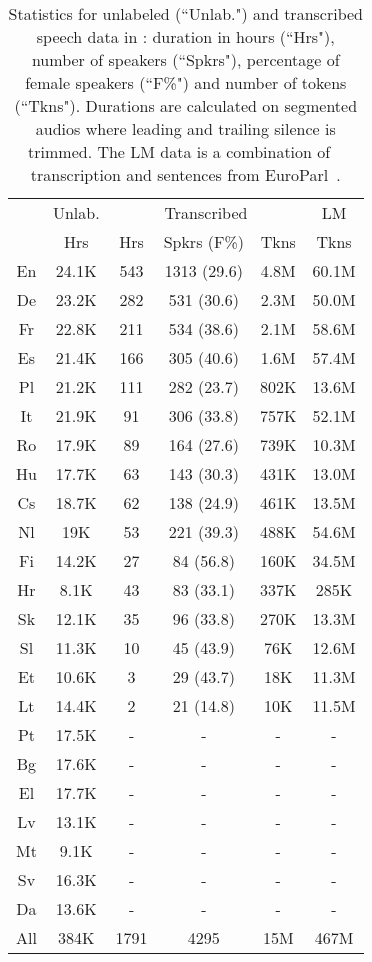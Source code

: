 \begin{table}[t]
    \centering
    \small
    \begin{tabular}{c|c|ccc|c}
    \toprule
    & Unlab. & \multicolumn{3}{c|}{Transcribed} & LM \\
    & Hrs & Hrs & Spkrs (F\%) & Tkns & Tkns \\
    \midrule
    En & 24.1K & 543 & 1313 (29.6) & 4.8M & 60.1M \\
    De & 23.2K & 282 & 531 (30.6) & 2.3M & 50.0M \\
    Fr & 22.8K & 211 & 534 (38.6) & 2.1M & 58.6M \\
    Es & 21.4K & 166 & 305 (40.6) & 1.6M & 57.4M \\
    Pl & 21.2K & 111 & 282 (23.7) & 802K & 13.6M \\
    It & 21.9K & 91 & 306 (33.8) & 757K & 52.1M \\
    Ro & 17.9K & 89 & 164 (27.6) & 739K & 10.3M \\
    Hu & 17.7K & 63 & 143 (30.3) & 431K & 13.0M \\
    Cs & 18.7K & 62 & 138 (24.9) & 461K & 13.5M \\
    Nl & 19K & 53 & 221 (39.3) & 488K & 54.6M \\
    Fi & 14.2K & 27 & 84 (56.8) & 160K & 34.5M \\
    Hr & 8.1K & 43 & 83 (33.1) & 337K & 285K \\
    Sk & 12.1K & 35 & 96 (33.8) & 270K & 13.3M \\
    Sl & 11.3K & 10 & 45 (43.9) & 76K & 12.6M \\
    Et & 10.6K & 3 & 29 (43.7) & 18K & 11.3M \\
    Lt & 14.4K & 2 & 21 (14.8) & 10K & 11.5M \\
    Pt & 17.5K & - & - & - & - \\
    Bg & 17.6K & - & - & - & - \\
    El & 17.7K & - & - & - & - \\
    Lv & 13.1K & - & - & - & - \\
    Mt & 9.1K & - & - & - & - \\
    Sv & 16.3K & - & - & - & - \\
    Da & 13.6K & - & - & - & - \\
    \midrule
    All & 384K & 1791 & 4295 & 15M & 467M \\
\bottomrule
    \end{tabular}
    \caption{Statistics for unlabeled (``Unlab.") and transcribed speech data in \vp: duration in hours (``Hrs"), number of speakers (``Spkrs"), percentage of female speakers (``F\%") and number of tokens (``Tkns"). Durations are calculated on segmented audios where leading and trailing silence is trimmed. The LM data is a combination of \vp~ transcription and sentences from EuroParl~\citep{koehn2005europarl}.}
    \label{tab:unlabeled_transcribed_stats}
\end{table}

